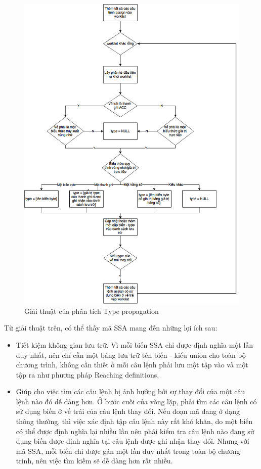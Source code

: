 \begin{figure}[h!]
	\centering
	\includegraphics[width=\linewidth]{image/typePropagationAlgo}
	\caption{Giải thuật của phân tích Type propagation}
	\label{fig:typepropagationalgo}
\end{figure}
Từ giải thuật trên, có thể thấy mã SSA mang đến những lợi ích sau:
\begin{itemize}
	\item Tiết kiệm không gian lưu trữ. Vì mỗi biến SSA chỉ được định nghĩa một lần duy nhất, nên chỉ cần một bảng lưu trữ tên biến - kiểu union cho toàn bộ chương trình, không cần thiết ở mỗi câu lệnh phải lưu một tập vào và một tập ra như phương pháp Reaching definitions.
	\item Giúp cho việc tìm các câu lệnh bị ảnh hưởng bởi sự thay đổi của một câu lệnh nào đó dễ dàng hơn. Ở bước cuối của vòng lặp, phải tìm các câu lệnh có sử dụng biến ở vế trái của câu lệnh thay đổi. Nếu đoạn mã đang ở dạng thông thường, thì việc xác định tập câu lệnh này rất khó khăn, do một biến có thể được định nghĩa lại nhiều lần nên phải kiểm tra câu lệnh nào đang sử dụng biến được định nghĩa tại câu lệnh được ghi nhận thay đổi. Nhưng với mã SSA, mỗi biến chỉ được gán một lần duy nhất trong toàn bộ chương trình, nên việc tìm kiếm sẽ dễ dàng hơn rất nhiều.
\end{itemize}

